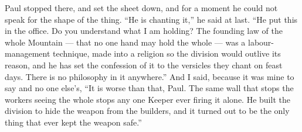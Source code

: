 \ornament

Paul stopped there, and set the sheet down, and for a moment he could not speak for the shape of the thing. ``He is chanting it,'' he said at last. ``He put this in the office. Do you understand what I am holding? The founding law of the whole Mountain --- that no one hand may hold the whole --- was a labour-management technique, made into a religion so the division would outlive its reason, and he has set the confession of it to the versicles they chant on feast days. There is no philosophy in it anywhere.'' And I said, because it was mine to say and no one else's, ``It is worse than that, Paul. The same wall that stops the workers seeing the whole stops any one Keeper ever firing it alone. He built the division to hide the weapon from the builders, and it turned out to be the only thing that ever kept the weapon safe.''\par

\ornament

